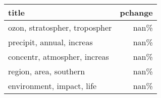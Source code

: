 \begin{tabular}{p{1.2cm}r}
\toprule
                         title &  pchange \\
\midrule
 ozon, stratospher, tropospher &     nan\% \\
     precipit, annual, increas &     nan\% \\
  concentr, atmospher, increas &     nan\% \\
        region, area, southern &     nan\% \\
     environment, impact, life &     nan\% \\
\bottomrule
\end{tabular}
